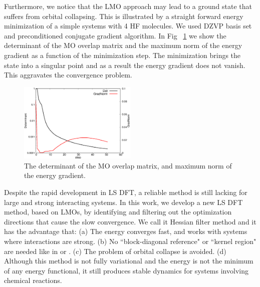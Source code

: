 \documentclass[prl,twocolumn,showpacs]{revtex4}
\begin{document}
Furthermore, we notice that the LMO approach may lead to a ground state that suffers from orbital collapsing. This is illustrated by a straight forward energy minimization of a simple systems with 4 HF molecules. We used DZVP basis set and preconditioned conjugate gradient algorithm. In Fig ~\ref{fig:det} we show the determinant of the MO overlap matrix and the maximum norm of the energy gradient as a function of the minimization step. The minimization brings the state into a singular point and as a result the energy gradient does not vanish. This aggravates the convergence problem.

\begin{figure}
\includegraphics[width=0.5\textwidth]{det}
\caption{The determinant of the MO overlap matrix, and maximum norm of the energy gradient. }
\label{fig:det}
\end{figure}

Despite the rapid development in LS DFT, a reliable method is still lacking for large and strong interacting systems. In this work, we develop a new LS DFT method, based on LMOs, by identifying and filtering out the optimization directions that cause the slow convergence. We call it Hessian filter method and it has the advantage that: (a) The energy converges fast, and works with systems where interactions are strong. (b) No ``block-diagonal reference" or ``kernel region" are needed like in \cite{tsuchida2007augmented} or \cite{khaliullin2013efficient}.
(c) The problem of orbital collapse is avoided. (d) Although this method is not fully variational and the energy is not the minimum of any energy functional, it still produces stable dynamics for systems involving chemical reactions. 
\end{document}
